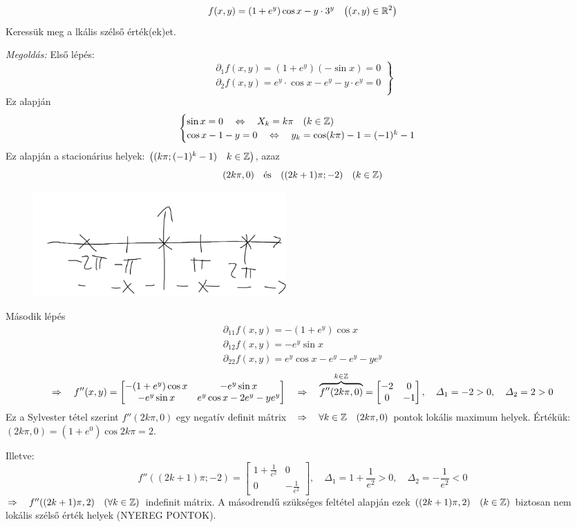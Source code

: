 \documentclass[a4paper,11.5pt]{article}
\begin{document}
	\begin{task}
		\[ f(x,y)=(1+e^y)\cos x-y\cdot 3^y\quad \big((x,y)\in\mathbb{R}^2 \big) \]
		Keressük meg a lkális szélső érték(ek)et.
		
		\textit{Megoldás:} Első lépés:
		\[\left.\begin{gathered}
			\partial_1f(x,y)=(1+e^y)(-\sin x)=0\\
			\partial_2f(x,y)=e^y\cdot\cos x-e^y-y\cdot e^y=0\\
		\end{gathered}\right\}  \]
		Ez alapján
		\[\begin{cases}
			\sin x=0\quad \Leftrightarrow\quad X_k=k\pi\quad (k\in\mathbb{Z})\\
			\cos x-1-y=0\quad \Leftrightarrow\quad y_k=\cos(k\pi)-1=(-1)^k-1
		\end{cases}\]
		Ez alapján a stacionárius helyek: $\big((k\pi; (-1)^k-1)\quad k\in\mathbb{Z}\big)$, azaz
		\[ (2k\pi,0)\quad \text{és}\quad ((2k+1)\pi; -2) \quad (k\in\mathbb{Z})\]
		\begin{figure}[H]
			\centering
			\includegraphics[height=4cm]{../2zh/kepek/39.png}
			\caption{}
		\end{figure}
		Második lépés
		\begin{align*}
			\partial_{11}f(x,y)=-(1+e^y)\cos x\\
			\partial_{12}f(x,y)=-e^y\sin x\\
			\partial_{22}f(x,y)=e^y\cos x-e^y-e^y-ye^y
		\end{align*}
		\[ \Rightarrow\quad f''(x,y)=\begin{bmatrix}
			-(1+e^y)\cos x&-e^y\sin x\\
			-e^y\sin x&e^y\cos x-2e^y-ye^y
		\end{bmatrix}\quad \Rightarrow\quad \overbrace{f''(2k\pi,0)}^{k\in\mathbb{Z}}=\begin{bmatrix}
			-2&0\\
			0&-1
		\end{bmatrix},\quad \varDelta_1=-2>0, \quad \varDelta_2=2>0 \]
		Ez a Sylvester tétel szerint $f''(2k\pi,0)$ egy negatív definit mátrix$\quad \Rightarrow\quad \forall k\in\mathbb{Z} \quad (2k\pi,0)$ pontok lokális maximum helyek. Értékük: $(2k\pi,0)=(1+e^0)\cos2k\pi=2$.
		
		Illetve:
		\[f''((2k+1)\pi;-2)=\begin{bmatrix}
			1+\frac{1}{e^2}&0\\
			0&-\frac{1}{e^2}
		\end{bmatrix},\quad \varDelta_1=1+\frac{1}{e^2}>0,\quad \varDelta_2=-\frac{1}{e^2}<0 \]
		$\Rightarrow\quad f''((2k+1)\pi,2)\quad (\forall k\in\mathbb{Z})$ indefinit mátrix. A másodrendű szükséges feltétel alapján ezek $((2k+1)\pi,2)\quad (k\in\mathbb{Z})$ biztosan nem lokális szélső érték helyek (NYEREG PONTOK).
	\end{task}
\end{document}
